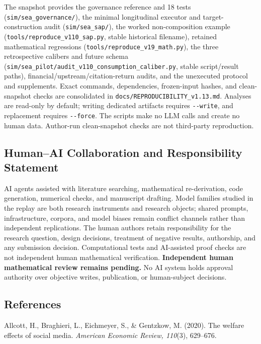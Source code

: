\documentclass[
  11pt]{article}
\begin{document}
The snapshot provides the governance reference and 18 tests
(\texttt{sim/sea\_governance/}), the minimal longitudinal executor and
target-construction audit (\texttt{sim/sea\_sap/}), the worked
non-composition example (\texttt{tools/reproduce\_v110\_sap.py}, stable
historical filename), retained mathematical regressions
(\texttt{tools/reproduce\_v19\_math.py}), the three retrospective
calibers and future schema
(\texttt{sim/sea\_pilot/audit\_v110\_consumption\_caliber.py}, stable
script/result paths), financial/upstream/citation-return audits, and the
unexecuted protocol and supplements. Exact commands, dependencies,
frozen-input hashes, and clean-snapshot checks are consolidated in
\texttt{docs/REPRODUCIBILITY\_v1.13.md}. Analyses are read-only by
default; writing dedicated artifacts requires \texttt{-\/-write}, and
replacement requires \texttt{-\/-force}. The scripts make no LLM calls
and create no human data. Author-run clean-snapshot checks are not
third-party reproduction.

\subsection{Human--AI Collaboration and Responsibility
Statement}\label{humanai-collaboration-and-responsibility-statement}

AI agents assisted with literature searching, mathematical
re-derivation, code generation, numerical checks, and manuscript
drafting. Model families studied in the replay are both research
instruments and research objects; shared prompts, infrastructure,
corpora, and model biases remain conflict channels rather than
independent replications. The human authors retain responsibility for
the research question, design decisions, treatment of negative results,
authorship, and any submission decision. Computational tests and
AI-assisted proof checks are not independent human mathematical
verification. \textbf{Independent human mathematical review remains
pending.} No AI system holds approval authority over objective writes,
publication, or human-subject decisions.

\subsection{References}\label{references}

Allcott, H., Braghieri, L., Eichmeyer, S., \& Gentzkow, M. (2020). The
welfare effects of social media. \emph{American Economic Review,
110}(3), 629--676.
\end{document}
